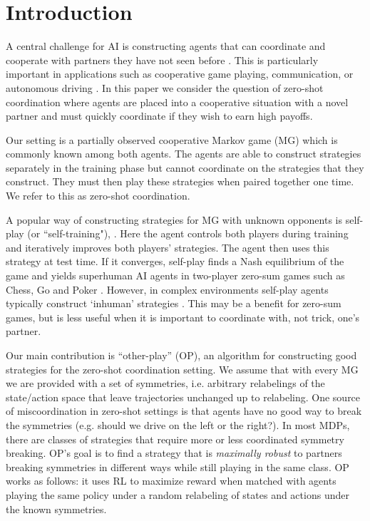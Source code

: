 \section{Introduction}
\label{sec:intro}
A central challenge for AI is constructing agents that can coordinate and cooperate with partners they have not seen before \citep{kleiman2016coordinate,lerer2017maintaining,carroll2019utility,shum2019theory}. This is particularly important in applications such as cooperative game playing, communication, or autonomous driving \cite{foerster2016learning,lazaridou2016multi,sukhbaatar2016learning,resnick2018vehicle}. In this paper we consider the question of zero-shot coordination where agents are placed into a cooperative situation with a novel partner and must quickly coordinate if they wish to earn high payoffs.

Our setting is a partially observed cooperative Markov game (MG) which is commonly known among both agents. The agents are able to construct strategies separately in the training phase but cannot coordinate on the strategies that they construct. They must then play these strategies when paired together one time. We refer to this as zero-shot coordination.

A popular way of constructing strategies for MG with unknown opponents is self-play (or ``self-training"), \cite{tesauro1994td}. Here the agent controls both players during training and iteratively improves both players' strategies. The agent then uses this strategy at test time. If it converges, self-play finds a Nash equilibrium of the game and yields superhuman AI agents in two-player zero-sum games such as Chess, Go and Poker \citep{campbell2002deep,silver2017mastering,brown2018superhuman}. However, in complex environments self-play agents typically construct `inhuman' strategies \citep{carroll2019utility}. This may be a benefit for zero-sum games, but is less useful when it is important to coordinate with, not trick, one's partner.

Our main contribution is ``other-play'' (OP), an algorithm for constructing good strategies for the zero-shot coordination setting. We assume that with every MG we are provided with a set of symmetries, i.e. arbitrary relabelings of the state/action space that leave trajectories unchanged up to relabeling. One source of miscoordination in zero-shot settings is that agents have no good way to break the symmetries (e.g. should we drive on the left or the right?). In most MDPs, there are classes of strategies that require more or less coordinated symmetry breaking. OP's goal is to find a strategy that is \textit{maximally robust} to partners breaking symmetries in different ways while still playing in the same class. OP works as follows: it uses RL to maximize reward when matched with agents playing the same policy under a random relabeling of states and actions under the known symmetries.


